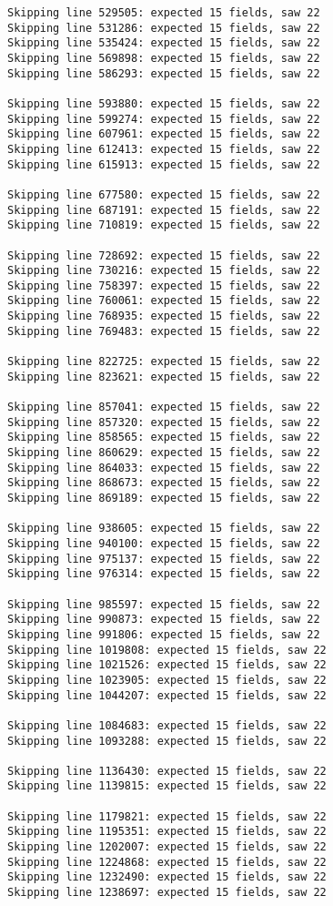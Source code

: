 \documentclass[11pt]{article}
\begin{document}
\begin{Verbatim}[commandchars=\\\{\}]
Skipping line 529505: expected 15 fields, saw 22
Skipping line 531286: expected 15 fields, saw 22
Skipping line 535424: expected 15 fields, saw 22
Skipping line 569898: expected 15 fields, saw 22
Skipping line 586293: expected 15 fields, saw 22

Skipping line 593880: expected 15 fields, saw 22
Skipping line 599274: expected 15 fields, saw 22
Skipping line 607961: expected 15 fields, saw 22
Skipping line 612413: expected 15 fields, saw 22
Skipping line 615913: expected 15 fields, saw 22

Skipping line 677580: expected 15 fields, saw 22
Skipping line 687191: expected 15 fields, saw 22
Skipping line 710819: expected 15 fields, saw 22

Skipping line 728692: expected 15 fields, saw 22
Skipping line 730216: expected 15 fields, saw 22
Skipping line 758397: expected 15 fields, saw 22
Skipping line 760061: expected 15 fields, saw 22
Skipping line 768935: expected 15 fields, saw 22
Skipping line 769483: expected 15 fields, saw 22

Skipping line 822725: expected 15 fields, saw 22
Skipping line 823621: expected 15 fields, saw 22

Skipping line 857041: expected 15 fields, saw 22
Skipping line 857320: expected 15 fields, saw 22
Skipping line 858565: expected 15 fields, saw 22
Skipping line 860629: expected 15 fields, saw 22
Skipping line 864033: expected 15 fields, saw 22
Skipping line 868673: expected 15 fields, saw 22
Skipping line 869189: expected 15 fields, saw 22

Skipping line 938605: expected 15 fields, saw 22
Skipping line 940100: expected 15 fields, saw 22
Skipping line 975137: expected 15 fields, saw 22
Skipping line 976314: expected 15 fields, saw 22

Skipping line 985597: expected 15 fields, saw 22
Skipping line 990873: expected 15 fields, saw 22
Skipping line 991806: expected 15 fields, saw 22
Skipping line 1019808: expected 15 fields, saw 22
Skipping line 1021526: expected 15 fields, saw 22
Skipping line 1023905: expected 15 fields, saw 22
Skipping line 1044207: expected 15 fields, saw 22

Skipping line 1084683: expected 15 fields, saw 22
Skipping line 1093288: expected 15 fields, saw 22

Skipping line 1136430: expected 15 fields, saw 22
Skipping line 1139815: expected 15 fields, saw 22

Skipping line 1179821: expected 15 fields, saw 22
Skipping line 1195351: expected 15 fields, saw 22
Skipping line 1202007: expected 15 fields, saw 22
Skipping line 1224868: expected 15 fields, saw 22
Skipping line 1232490: expected 15 fields, saw 22
Skipping line 1238697: expected 15 fields, saw 22


\end{Verbatim}
\end{document}
